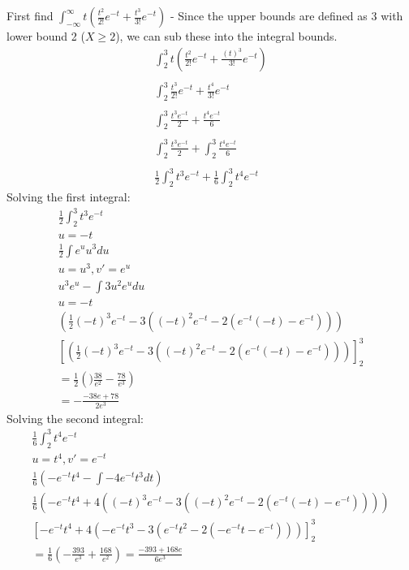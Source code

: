 \documentclass[oneside, a4paper]{article}
\begin{document}
First find $\int _{-\infty}^{\infty} t \left(\frac{t^2}{2!} e^{-t} + \frac{t^3}{3!} e^{-t}\right)$ 
- Since the upper bounds are defined as 3 with lower bound 2 ($X \geq 2$), we can sub these into the integral bounds.
\begin{equation}
    \begin{split}
        \int _{2}^{3} t \left( \frac{t^2}{2!} e^{-t} + \frac{(t)^3}{3!} e^{-t} \right) \\ \\
        \int _{2}^{3} \frac{t^3}{2!} e^{-t} + \frac{t^4}{3!} e^{-t} \\ \\ 
        \int _{2}^{3} \frac{t^3 e^{-t}}{2} + \frac{t^4 e^{-t}}{6} \\ \\ 
        \int _{2}^{3} \frac{t^3 e^{-t}}{2} + \int _{2}^{3} \frac{t^4 e^{-t}}{6} \\ \\ 
        \frac{1}{2} \int _{2}^{3} t^3 e^{-t} + \frac{1}{6} \int _{2}^{3} t^4 e^{-t}
    \end{split}
\end{equation}
Solving the first integral:
\begin{equation}
    \begin{split}
        \frac{1}{2} \int _{2}^{3} t^3 e^{-t} \\ 
        u = -t \\
        \frac{1}{2} \int e^u u^3du \\ 
        u = u^3, v' = e^u\\
        u^3 e^u - \int 3 u^2 e^u du \\ 
        u = -t \\
        \left(\frac{1}{2}\left(-t\right)^3e^{-t}-3\left(\left(-t\right)^2e^{-t}-2\left(e^{-t}\left(-t\right)-e^{-t}\right)\right)\right)\\
        \left[\left(\frac{1}{2}\left(-t\right)^3e^{-t}-3\left(\left(-t\right)^2e^{-t}-2\left(e^{-t}\left(-t\right)-e^{-t}\right)\right)\right) \right]^3_2 \\
        = \frac{1}{2} \left()\frac{38}{e^2} - \frac{78}{e^3}\right) \\
        = -\frac{-38e+78}{2e^3}
    \end{split}
\end{equation}
Solving the second integral:
\begin{equation}
    \begin{split}
        \frac{1}{6} \int _{2}^{3} t^4 e^{-t} \\
        u=t^4, v'=e^{-t} \\
        \frac{1}{6} \left(-e^{-t}t^4 - \int -4e^{-t}t^3dt\right) \\
        \frac{1}{6} \left(-e^{-t}t^4 + 4\left(\left(-t\right)^3e^{-t}-3\left(\left(-t\right)^2e^{-t}-2\left(e^{-t}\left(-t\right)-e^{-t}\right)\right)\right)\right) \\
        \left[-e^{-t}t^4+4\left(-e^{-t}t^3-3\left(e^{-t}t^2-2\left(-e^{-t}t-e^{-t}\right)\right)\right)\right]^3_2 \\
         = \frac{1}{6}\left(-\frac{393}{e^3}+\frac{168}{e^2}\right)
         = \frac{-393+168e}{6e^3}
    \end{split}
\end{equation}
\end{document}
